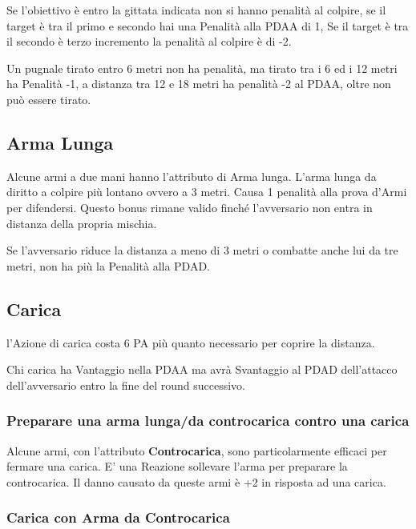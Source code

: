 \documentclass[12pt,a4paper,twoside,openany]{book}
\begin{document}
\begin{multicols}{2}
Se l'obiettivo è entro la gittata indicata non si hanno penalità al colpire, se il target è tra il primo e secondo hai una Penalità alla PDAA di 1, Se il target è tra il secondo è terzo incremento la penalità al colpire è di -2.

Un pugnale tirato entro 6 metri non ha penalità, ma tirato tra i 6 ed i 12 metri ha Penalità -1, a distanza tra 12 e 18 metri ha penalità -2 al PDAA, oltre non può essere tirato.

\subsection{Arma Lunga} \label{armalunga}

Alcune armi a due mani hanno l'attributo di Arma lunga. L'arma lunga da diritto a colpire più lontano ovvero a 3 metri. Causa 1 penalità alla prova d'Armi per difendersi. Questo bonus rimane valido finché l'avversario non entra in distanza della propria mischia.

Se l'avversario riduce la distanza a meno di 3 metri o combatte anche lui da tre metri, non ha più la Penalità alla PDAD.

\subsection{Carica} \label{carica}

l'Azione di carica costa 6 PA più quanto necessario per coprire la distanza.

Chi carica ha Vantaggio nella PDAA ma avrà Svantaggio al PDAD dell'attacco dell'avversario entro la fine del round successivo.

\subsubsection{Preparare una arma lunga/da controcarica contro una carica} \label{prepararearmalungacontrocarica}

Alcune armi, con l'attributo \textbf{Controcarica}, sono particolarmente efficaci per fermare una carica. E' una Reazione sollevare l'arma per preparare la controcarica. Il danno causato da queste armi è +2 in risposta ad una carica.

\subsubsection{Carica con Arma da Controcarica} \label{caricaarmadacontrocarica}


\end{multicols}
\end{document}
